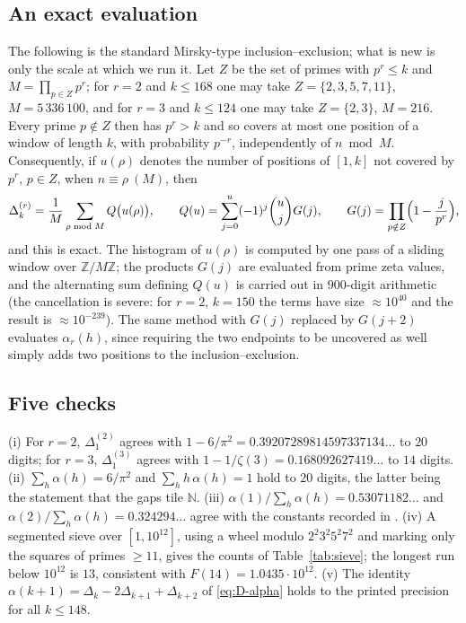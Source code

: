 \documentclass[10pt,a4paper]{amsart}
\numberwithin{equation}{section}
\newcommand{\N}{\mathbb{N}}
\newcommand{\Z}{\mathbb{Z}}
\begin{document}
\subsection{An exact evaluation}
The following is the standard Mirsky-type inclusion--exclusion; what is new is only the
scale at which we run it. Let $Z$ be the set of primes with $p^{r}\le k$ and
$M=\prod_{p\in Z}p^{r}$; for $r=2$ and $k\le168$ one may take $Z=\{2,3,5,7,11\}$,
$M=5\,336\,100$, and for $r=3$ and $k\le124$ one may take $Z=\{2,3\}$, $M=216$. Every prime
$p\notin Z$ then has $p^{r}>k$ and so covers at most one position of a window of length
$k$, with probability $p^{-r}$, independently of $n\bmod M$. Consequently, if $u(\rho)$
denotes the number of positions of $[1,k]$ not covered by $p^{r}$, $p\in Z$, when
$n\equiv\rho\ (M)$, then
\begin{equation}\label{eq:exact}
  \Delta^{(r)}_k=\frac1M\sum_{\rho\bmod M}Q\bigl(u(\rho)\bigr),\qquad
  Q(u)=\sum_{j=0}^{u}(-1)^{j}\binom{u}{j}G(j),\qquad
  G(j)=\prod_{p\notin Z}\Bigl(1-\frac j{p^{r}}\Bigr),
\end{equation}
and this is exact. The histogram of $u(\rho)$ is computed by one pass of a sliding window
over $\Z/M\Z$; the products $G(j)$ are evaluated from prime zeta values, and the
alternating sum defining $Q(u)$ is carried out in $900$-digit arithmetic (the cancellation
is severe: for $r=2$, $k=150$ the terms have size $\approx10^{40}$ and the result is
$\approx10^{-239}$). The same method with $G(j)$ replaced by $G(j+2)$ evaluates
$\alpha_r(h)$, since requiring the two endpoints to be uncovered as well simply adds two
positions to the inclusion--exclusion.

\subsection{Five checks}
(i) For $r=2$, $\Delta^{(2)}_1$ agrees with $1-6/\pi^{2}=0.39207289814597337134\ldots$ to
$20$ digits; for $r=3$, $\Delta^{(3)}_1$ agrees with $1-1/\zeta(3)=0.168092627419\ldots$
to $14$ digits. (ii) $\sum_h\alpha(h)=6/\pi^{2}$ and $\sum_h h\,\alpha(h)=1$ hold to $20$
digits, the latter being the statement that the gaps tile $\N$. (iii)
$\alpha(1)/\sum_h\alpha(h)=0.53071182\ldots$ and $\alpha(2)/\sum_h\alpha(h)=0.324294\ldots$
agree with the constants recorded in \cite[\texttt{A076259}]{OEIS}. (iv) A segmented sieve
over $[1,10^{12}]$, using a wheel modulo $2^{2}3^{2}5^{2}7^{2}$ and marking only the squares
of primes $\ge11$, gives the counts of Table~\ref{tab:sieve}; the longest run below
$10^{12}$ is $13$, consistent with $F(14)=1.0435\cdot10^{12}$. (v) The identity
$\alpha(k+1)=\Delta_k-2\Delta_{k+1}+\Delta_{k+2}$ of \eqref{eq:D-alpha} holds to the
printed precision for all $k\le148$.
\end{document}
